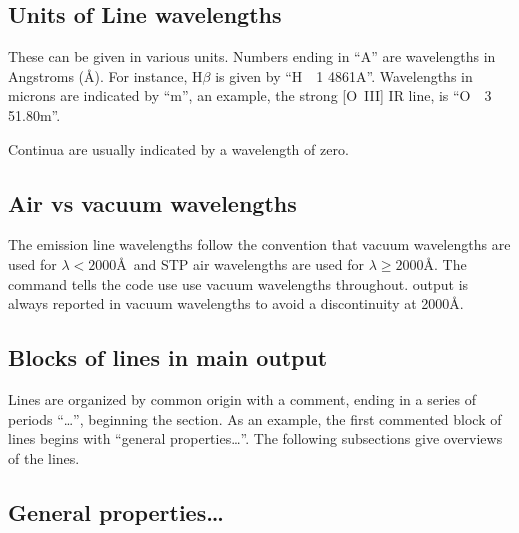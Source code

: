 \subsection{Units of Line wavelengths}
These can be given in various units.
Numbers ending
in ``A'' are wavelengths in Angstroms (\AA ).
For instance, H$\beta$ is given by ``H~~1  4861A''.
Wavelengths in microns are indicated by ``m'', an example,
the strong [O~III] IR line, is ``O~~3 51.80m''.

Continua are usually
indicated by a wavelength of zero.

\subsection{Air vs vacuum wavelengths}

The emission line wavelengths follow the convention that vacuum wavelengths
are used for $\lambda < 2000$\AA\ and STP air wavelengths are used
for $\lambda \ge 2000$\AA.
The  command tells the code use use vacuum wavelengths throughout.
 output is always reported in vacuum wavelengths to avoid 
a discontinuity at 2000\AA.

\subsection{Blocks of lines in main output}

Lines are organized by common origin with a comment, ending in a series
of periods ``\dots'', beginning the section.
As an example, the first
commented block of lines begins with ``general properties\dots''.
The
following subsections give overviews of the lines.

\subsection{General properties\dots}

